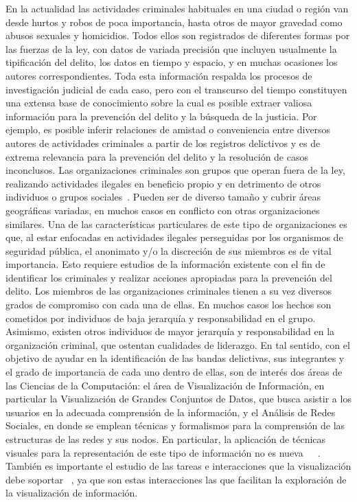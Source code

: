 
En la actualidad las actividades criminales habituales en una ciudad o región van desde hurtos y robos de poca importancia, hasta otros de mayor gravedad como abusos sexuales y  homicidios. Todos ellos son registrados de diferentes formas por las fuerzas de la ley, con datos de variada precisión que incluyen usualmente la tipificación del delito, los datos en tiempo y espacio, y en muchas ocasiones los autores correspondientes.
Toda esta información respalda los procesos de investigación judicial de cada caso, pero con el transcurso del tiempo constituyen una extensa base de conocimiento sobre la cual es posible extraer valiosa información para la prevención del delito y la búsqueda de la justicia. 
Por ejemplo, es posible inferir relaciones de amistad o conveniencia entre diversos autores de actividades criminales a partir de los registros delictivos y es de extrema relevancia para la prevención del delito y la resolución de casos inconclusos.
Las organizaciones criminales son grupos que operan fuera de la ley, realizando actividades ilegales en beneficio propio y en detrimento de otros individuos o grupos sociales~\cite{finckenauer2005problems}. Pueden ser de diverso tamaño y cubrir áreas geográficas variadas, en muchos casos en conflicto con otras organizaciones similares. Una de las características particulares de este tipo de organizaciones es que, al estar enfocadas en actividades ilegales perseguidas por los organismos de seguridad pública, el anonimato y/o la discreción de sus miembros es de vital importancia. Esto requiere estudios de la información existente con el fin de identificar los criminales y realizar acciones apropiadas para la prevención del delito.
Los miembros de las organizaciones criminales tienen a su vez diversos grados de compromiso con cada una de ellas. En muchos casos los hechos son cometidos por individuos de baja jerarquía y responsabilidad en el grupo. Asimismo, existen otros individuos de mayor jerarquía y responsabilidad en la organización criminal, que ostentan cualidades de liderazgo.
En tal sentido, con el objetivo de ayudar en la identificación de las bandas delictivas, sus integrantes y el grado de importancia de cada uno dentro de ellas, son de interés dos áreas de las Ciencias de la Computación: el área de Visualización de Información, en particular la Visualización de Grandes Conjuntos de Datos, que busca asistir a los usuarios en la adecuada comprensión de la información, y el Análisis de Redes Sociales, en donde se emplean técnicas y formalismos para la comprensión de las estructuras de las redes y sus nodos. 
En particular, la aplicación de técnicas visuales para la representación de este tipo de información no es nueva~\cite{xu2005criminal}~\cite{feng2019big}~\cite{mathew2021criminal}. También es importante el estudio de las tareas e interacciones que la visualización debe soportar ~\cite{chen2005visualization}, ya que son estas interacciones las que facilitan la exploración de la visualización de información.

